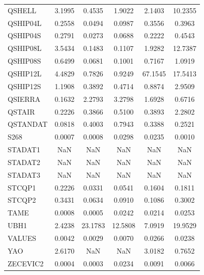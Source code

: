 \begin{longtable}{lccccc}
QSHELL   &   3.1995 &   0.4535 &   1.9022 &   2.1403 &  10.2355 \\
QSHIP04L &   0.2558 &   0.0494 &   0.0987 &   0.3556 &   0.3963 \\
QSHIP04S &   0.2791 &   0.0273 &   0.0688 &   0.2222 &   0.4543 \\
QSHIP08L &   3.5434 &   0.1483 &   0.1107 &   1.9282 &  12.7387 \\
QSHIP08S &   0.6499 &   0.0681 &   0.1001 &   0.7167 &   1.0919 \\
QSHIP12L &   4.4829 &   0.7826 &   0.9249 &  67.1545 &  17.5413 \\
QSHIP12S &   1.1908 &   0.3892 &   0.4714 &   0.8874 &   2.9509 \\
QSIERRA  &   0.1632 &   2.2793 &   3.2798 &   1.6928 &   0.6716 \\
QSTAIR   &   0.2226 &   0.3866 &   0.5100 &   0.3893 &   2.2802 \\
QSTANDAT &   0.0818 &   0.4003 &   0.7943 &   0.3388 &   0.2521 \\
S268     &   0.0007 &   0.0008 &   0.0298 &   0.0235 &   0.0010 \\
STADAT1  &      NaN &      NaN &      NaN &      NaN &      NaN \\
STADAT2  &      NaN &      NaN &      NaN &      NaN &      NaN \\
STADAT3  &      NaN &      NaN &      NaN &      NaN &      NaN \\
STCQP1   &   0.2226 &   0.0331 &   0.0541 &   0.1604 &   0.1811 \\
STCQP2   &   0.3431 &   0.0634 &   0.0910 &   0.1086 &   0.3002 \\
TAME     &   0.0008 &   0.0005 &   0.0242 &   0.0214 &   0.0253 \\
UBH1     &   2.4238 &  23.1783 &  12.5808 &   7.0919 &  19.9529 \\
VALUES   &   0.0042 &   0.0029 &   0.0070 &   0.0266 &   0.0238 \\
YAO      &   2.6170 &      NaN &      NaN &   3.0182 &   0.7652 \\
ZECEVIC2 &   0.0004 &   0.0003 &   0.0234 &   0.0091 &   0.0066 \\
\end{longtable}
